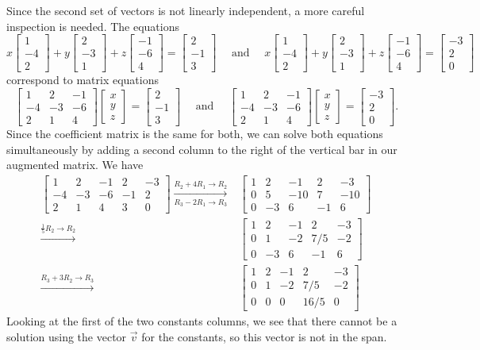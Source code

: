 \documentclass[12pt]{article}
\newcommand{\bbm}{\begin{bmatrix}}
\newcommand{\ebm}{\end{bmatrix}}
\begin{document}
\begin{enumerate}
Since the second set of vectors is not linearly independent, a more careful inspection is needed. The equations
\[
x\bbm 1\\-4\\2\ebm+y \bbm 2\\-3\\1\ebm+z \bbm -1\\-6\\4\ebm = \bbm 2\\-1\\3\ebm \quad \text{ and } \quad x\bbm 1\\-4\\2\ebm+y \bbm 2\\-3\\1\ebm+z \bbm -1\\-6\\4\ebm=\bbm -3\\2\\0\ebm
\]
correspond to matrix equations 
\[
\bbm 1&2&-1\\-4&-3&-6\\2&1&4\ebm\bbm x\\y\\z\ebm=\bbm 2\\-1\\3\ebm \quad \text{ and } \quad \bbm 1&2&-1\\-4&-3&-6\\2&1&4\ebm\bbm x\\y\\z\ebm = \bbm -3\\2\\0\ebm.
\]
Since the coefficient matrix is the same for both, we can solve both equations simultaneously by adding a second column to the right of the vertical bar in our augmented matrix. We have
\begin{align*}
\left[\begin{array}{ccc|c|c}
1&2&-1&2&-3\\
-4&-3&-6&-1&2\\
2&1&4&3&0
\end{array}\right] \xrightarrow[R_3-2R_1\to R_3]{R_2+4R_1\to R_2}
&\left[\begin{array}{ccc|c|c}
1&2&-1&2&-3\\
0&5&-10&7&-10\\
0&-3&6&-1&6
\end{array}\right]\\
\xrightarrow{\frac15 R_2\to R_2}
&\left[\begin{array}{ccc|c|c}
1&2&-1&2&-3\\
0&1&-2&7/5&-2\\
0&-3&6&-1&6
\end{array}\right]\\
\xrightarrow{R_3+3R_2\to R_3}
&\left[\begin{array}{ccc|c|c}
1&2&-1&2&-3\\
0&1&-2&7/5&-2\\
0&0&0&16/5&0
\end{array}\right]
\end{align*}
Looking at the first of the two constants columns, we see that there cannot be a solution using the vector $\vec{v}$ for the constants, so this vector is not in the span.


\end{enumerate}
\end{document}

